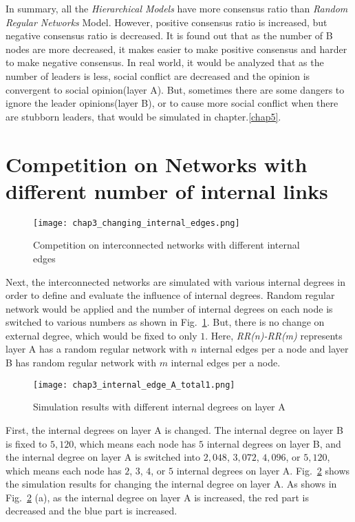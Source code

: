 In summary, all the \textit{Hierarchical Models} have more consensus ratio than \textit{Random Regular Networks} Model. However, positive consensus ratio is increased, but negative consensus ratio is decreased. It is found out that as the number of B nodes are more decreased, it makes easier to make positive consensus and harder to make negative consensus. In real world, it would be analyzed that as the number of leaders is less, social conflict are decreased and the opinion is convergent to social opinion(layer A). But, sometimes there are some dangers to ignore the leader opinions(layer B), or to cause more social conflict when there are stubborn leaders, that would be simulated in chapter.\ref{chap5}. \\

\section{Competition on Networks with different number of internal links}
\begin{figure}[!htb]
	\centering
	\texttt{[image: chap3\_changing\_internal\_edges.png]}
	\caption{Competition on interconnected networks with different internal edges}
	\label{chap3_changing_internal_edges}
\end{figure}
Next, the interconnected networks are simulated with various internal degrees in order to define and evaluate the influence of internal degrees. Random regular network would be applied and the number of internal degrees on each node is switched to various numbers as shown in Fig.~\ref{chap3_changing_internal_edges}. But, there is no change on external degree, which would be fixed to only $1$. Here, \textit{RR(n)-RR(m)} represents layer A has a random regular network with $n$ internal edges per a node and layer B has random regular network with $m$ internal edges per a node.
\begin{figure}[!htb]
	\centering
	\texttt{[image: chap3\_internal\_edge\_A\_total1.png]}
	\caption{Simulation results with different internal degrees on layer A}
	\label{chap3_internal_edge_A_total}
\end{figure}
First, the internal degrees on layer A is changed. The internal degree on layer B is fixed to $5,120$, which means each node has $5$ internal degrees on layer B, and the internal degree on layer A is switched into $2,048$, $3,072$, $4,096$, or $5,120$, which means each node has $2$, $3$, $4$, or $5$ internal degrees on layer A. Fig.~\ref{chap3_internal_edge_A_total} shows the simulation results for changing the internal degree on layer A. As shows in Fig.~\ref{chap3_internal_edge_A_total} (a), as the internal degree on layer A is increased, the red part is decreased and the blue part is increased.  

